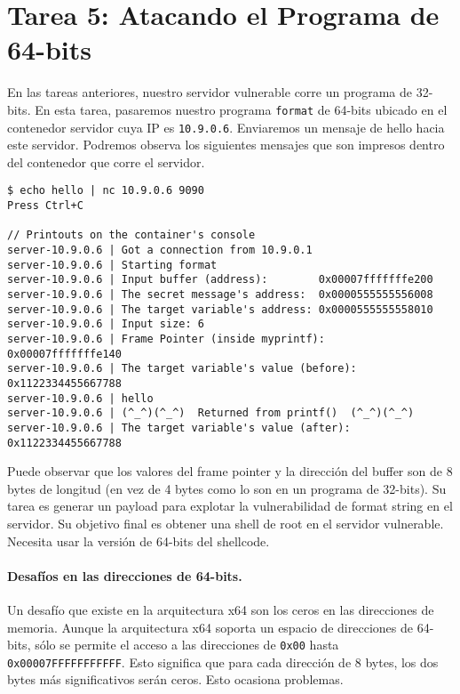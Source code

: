 \section{Tarea 5: Atacando el Programa de 64-bits}

En las tareas anteriores, nuestro servidor vulnerable corre un programa de 32-bits. En esta tarea, pasaremos nuestro programa \texttt{format} de 64-bits ubicado en el contenedor servidor cuya IP es \texttt{10.9.0.6}.
Enviaremos un mensaje de hello hacia este servidor.
Podremos observa los siguientes mensajes que son impresos dentro del contenedor que corre el servidor.


\begin{lstlisting}
$ echo hello | nc 10.9.0.6 9090
Press Ctrl+C

// Printouts on the container's console
server-10.9.0.6 | Got a connection from 10.9.0.1
server-10.9.0.6 | Starting format
server-10.9.0.6 | Input buffer (address):        0x00007fffffffe200
server-10.9.0.6 | The secret message's address:  0x0000555555556008
server-10.9.0.6 | The target variable's address: 0x0000555555558010
server-10.9.0.6 | Input size: 6
server-10.9.0.6 | Frame Pointer (inside myprintf):      0x00007fffffffe140
server-10.9.0.6 | The target variable's value (before): 0x1122334455667788
server-10.9.0.6 | hello
server-10.9.0.6 | (^_^)(^_^)  Returned from printf()  (^_^)(^_^)
server-10.9.0.6 | The target variable's value (after):  0x1122334455667788
\end{lstlisting}
 
Puede observar que los valores del frame pointer y la dirección del buffer son de 8 bytes de longitud (en vez de 4 bytes como lo son en un programa de 32-bits).
Su tarea es generar un payload para explotar la vulnerabilidad de format string en el servidor.
Su objetivo final es obtener una shell de root en el servidor vulnerable. Necesita usar la versión de 64-bits del shellcode.


\paragraph{Desafíos en las direcciones de 64-bits.}
Un desafío que existe en la arquitectura x64 son los ceros en las direcciones de memoria. Aunque la arquitectura x64 soporta un espacio de direcciones de 64-bits, sólo se permite el acceso a las direcciones de  \texttt{0x00} hasta \texttt{0x00007FFFFFFFFFFF}. Esto significa que para cada dirección de 8 bytes, los dos bytes más significativos serán ceros.
Esto ocasiona problemas.

